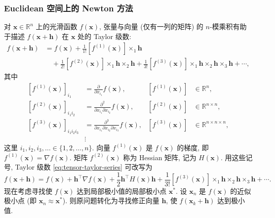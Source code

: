 \subsubsection{{Euclidean 空间上的 Newton 方法}}\label{subsec:euclidean-newton}
{对 $\boldsymbol{x}\in\mathbb{R}^n$ 上的光滑函数 $f(\boldsymbol{x})$, 张量与向量 (仅有一列的矩阵) 的 $n$-模乘积有助于描述 $f(\boldsymbol{x}+\boldsymbol{h})$ 在 $\boldsymbol{x}$ 处的 Taylor 级数:}
\begin{align}
f(\boldsymbol{x}+\boldsymbol{h})&=f(\boldsymbol{x})+\frac1{1!}[f^{(1)}(\boldsymbol{x})]\times_1\boldsymbol{h}\label{eq:tensor-taylor-first-line}\\
&\quad+\frac1{2!}[f^{(2)}(\boldsymbol{x})]\times_1\boldsymbol{h}\times_2\boldsymbol{h}+\frac1{3!}[f^{(3)}(\boldsymbol{x})]\times_1\boldsymbol{h}\times_2\boldsymbol{h}\times_3\boldsymbol{h}+\cdots,\label{eq:tensor-taylor-series}
\end{align}
{其中}
\[\begin{aligned}
[f^{(1)}(\boldsymbol{x})]_{i_1}&=\frac{\partial}{\partial x_{i_1}}f(\boldsymbol{x}),&[f^{(1)}(\boldsymbol{x})]&\in\mathbb{R}^n,\\
[f^{(2)}(\boldsymbol{x})]_{i_1i_2}&=\frac{\partial^2}{\partial x_{i_1}\partial x_{i_2}}f(\boldsymbol{x}),&[f^{(2)}(\boldsymbol{x})]&\in\mathbb{R}^{n\times n},\\
[f^{(3)}(\boldsymbol{x})]_{i_1i_2i_3}&=\frac{\partial^3}{\partial x_{i_1}\partial x_{i_2}\partial x_{i_3}}f(\boldsymbol{x}),&[f^{(3)}(\boldsymbol{x})]&\in\mathbb{R}^{n\times n\times n},\\
&\vdots
\end{aligned}\]
{这里 $i_1,i_2,i_3,\ldots\in\{1,2,\ldots,n\}$. 向量 $f^{(1)}(\boldsymbol{x})$ 是 $f(\boldsymbol{x})$ 的梯度, 即 $f^{(1)}(\boldsymbol{x})=\nabla f(\boldsymbol{x})$. 矩阵 $f^{(2)}(\boldsymbol{x})$ 称为 Hessian 矩阵, 记为 $H(\boldsymbol{x})$. 用这些记号, Taylor 级数 \eqref{eq:tensor-taylor-series} 可改写为}
\begin{equation}\label{eq:gradient-hessian-taylor-series}
f(\boldsymbol{x}+\boldsymbol{h})=f(\boldsymbol{x})+\boldsymbol{h}^{\top}\nabla f(\boldsymbol{x})+\frac12\boldsymbol{h}^{\top}H(\boldsymbol{x})\boldsymbol{h}+\frac1{3!}[f^{(3)}(\boldsymbol{x})]\times_1\boldsymbol{h}\times_2\boldsymbol{h}\times_3\boldsymbol{h}+\cdots.
\end{equation}
{现在考虑寻找使 $f(\boldsymbol{x})$ 达到局部极小值的局部极小点 $\boldsymbol{x}^*$. 设 $\boldsymbol{x}_n$ 是 $f(\boldsymbol{x})$ 的近似极小点 (即 $\boldsymbol{x}_n\approx\boldsymbol{x}^*$). 则原问题转化为寻找修正向量 $\boldsymbol{h}$, 使 $f(\boldsymbol{x}_k+\boldsymbol{h})$ 达到极小值.}
